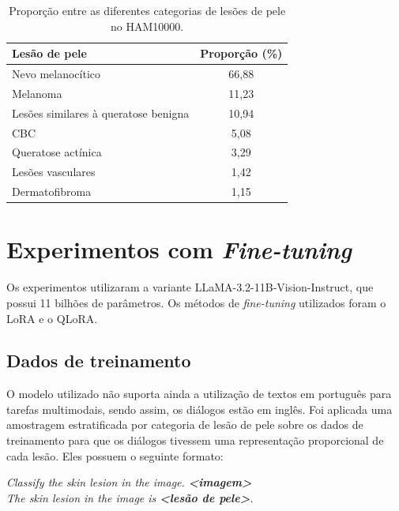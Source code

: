\begin{table}[ht]
    \caption{\small Proporção entre as diferentes categorias de lesões de pele no \ac{HAM10000}.}
    \centering
    \begin{tabular}{l|c}
        \hline
        Lesão de pele                        & Proporção (\%) \\ \hline
        Nevo melanocítico                    & 66,88          \\
        Melanoma                             & 11,23          \\
        Lesões similares à queratose benigna & 10,94          \\
        \ac{CBC}                             & 5,08           \\
        Queratose actínica                   & 3,29           \\
        Lesões vasculares                    & 1,42           \\
        Dermatofibroma                       & 1,15           \\ \hline
    \end{tabular}
    \label{tab:ham10000_proportion}
\end{table}

\section{Experimentos com \textit{Fine-tuning}}

Os experimentos utilizaram a variante \ac{LLaMA}-3.2-11B-Vision-Instruct, que possui 11 bilhões de parâmetros. Os
métodos de \textit{fine-tuning} utilizados foram o \ac{LoRA} e o \ac{QLoRA}.

\subsection{Dados de treinamento}

O modelo utilizado não suporta ainda a utilização de textos em português para tarefas multimodais, sendo assim, os
diálogos estão em inglês. Foi aplicada uma amostragem estratificada por categoria de lesão de pele sobre os dados de
treinamento para que os diálogos tivessem uma representação proporcional de cada lesão. Eles possuem o seguinte
formato:

\begin{dialogue}
     \textit{Classify the skin lesion in the image. \textbf{<imagem>}} \\
     \textit{The skin lesion in the image is \textbf{<lesão de pele>}.}
\end{dialogue}

